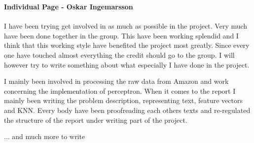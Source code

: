 \newpage
\textbf{Individual Page - Oskar Ingemarsson} \\\\
I have been trying get involved in as much as possible in the project.
Very much have been done together in the group. This have been working
splendid and I think that this working style have benefited the project most
greatly. Since every one have touched almost everything the credit should go to
the group. I will however try to write something about what especially I have
done in the project.

I mainly been involved in processing the raw data from Amazon and work
concerning the implementation of perceptron. When it comes to the report I
mainly been writing the problem description, representing text, feature vectors
and KNN. Every body have been proofreading each others texts and re-regulated the
structure of the report under writing part of the project.

... and much more to write




